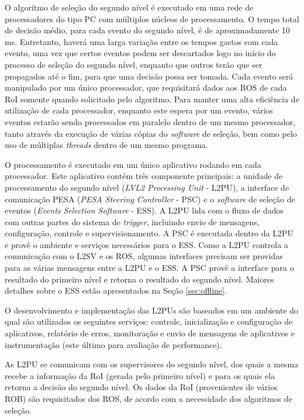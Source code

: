 O algoritmo de seleção do segundo nível é executado em uma rede de processadores do tipo PC com múltiplos núcleos de processamento. O tempo total de decisão médio, para cada evento do segundo nível, é de aproximadamente 10 ms. Entretanto, haverá uma larga variação entre os tempos gastos com cada evento, uma vez que certos eventos podem ser descartados logo no início do processo de seleção do segundo nível, enquanto que outros terão que ser propagados até o fim, para que uma decisão possa ser tomada. Cada evento será manipulado por um único processador, que requisitará dados aos ROS de cada RoI somente quando solicitado pelo algoritmo. Para manter uma alta eficiência de utilização de cada processador, enquanto este espera por um evento, vários eventos estarão sendo processados em paralelo dentro de um mesmo processador, tanto através da execução de várias cópias do \emph{software} de seleção, bem como pelo uso de múltiplas \emph{threads} dentro de um mesmo programa.

O processamento é executado em um único aplicativo rodando em cada processador. Este aplicativo contém três componente principais: a unidade de processamento do segundo nível (\emph{LVL2 Processing Unit} - L2PU), a interface de comunicação PESA (\emph{PESA Steering Controller} - PSC) e o \emph{software} de seleção de eventos (\emph{Events Selection Software} - ESS). A L2PU lida com o fluxo de dados com outras partes do sistema de \emph{trigger}, incluindo envio de mensagens, configuração, controle e supervisionamento. A PSC é executada dentro da L2PU e provê o ambiente e serviços necessários para o ESS. Como a L2PU controla a comunicação com o L2SV e os ROS, algumas interfaces precisam ser providas para as várias mensagens entre a L2PU e o ESS. A PSC provê a interface para o resultado do primeiro nível e retorna o resultado do segundo nível. Maiores detalhes sobre o ESS estão apresentados na Seção \ref{sec:offline}.

O desenvolvimento e implementação das L2PUs são baseados em um ambiente \cite{bib:tdaq_tdr} do qual são utilizados os seguintes serviços: controle, inicialização e configuração de aplicativos, relatório de erros, monitoração e envio de mensagens de aplicativos e instrumentação (este último para avaliação de performance).

As L2PU se comunicam com os supervisores do segundo nível, dos quais a mesma recebe a informação da RoI (gerada pelo primeiro nível) e para os quais ela retorna a decisão do segundo nível. Os dados da RoI (provenientes de vários ROB) são requisitados dos ROS, de acordo com a necessidade dos algoritmos de seleção.

